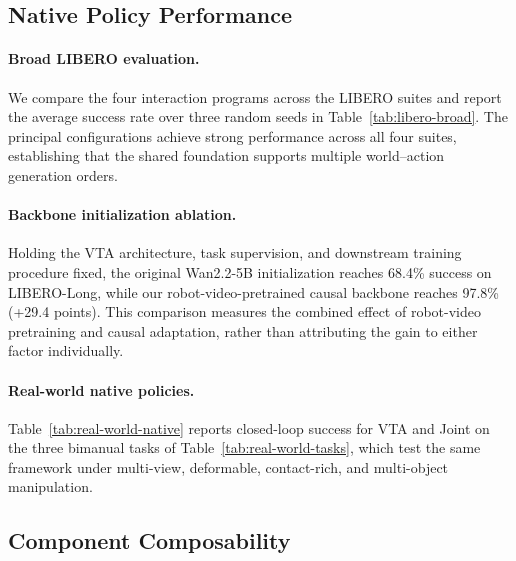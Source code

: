 \subsection{Native Policy Performance}
\label{sec:native-policy-performance}

\paragraph{Broad LIBERO evaluation.}
We compare the four interaction programs across the LIBERO suites and
report the average success rate over three random seeds in
Table~\ref{tab:libero-broad}.
The principal \ours configurations achieve strong performance across all
four suites, establishing that the shared foundation supports multiple
world--action generation orders.

\paragraph{Backbone initialization ablation.}
Holding the VTA architecture, task supervision, and downstream training
procedure fixed, the original Wan2.2-5B initialization reaches 68.4\%
success on LIBERO-Long, while our robot-video-pretrained causal backbone
reaches 97.8\% (+29.4 points). This comparison measures the combined effect
of robot-video pretraining and causal adaptation, rather than attributing the
gain to either factor individually.


\paragraph{Real-world native policies.}



Table~\ref{tab:real-world-native} reports closed-loop success for VTA and
Joint on the three bimanual tasks of Table~\ref{tab:real-world-tasks}, which
test the same framework under multi-view, deformable, contact-rich,
and multi-object manipulation.


\subsection{Component Composability}
\label{sec:component-composability}


